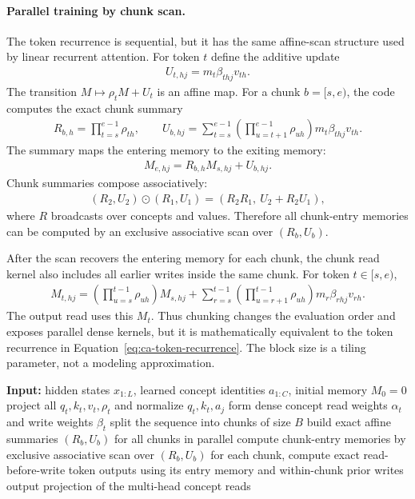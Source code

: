 \paragraph{Parallel training by chunk scan.}
The token recurrence is sequential, but it has the same affine-scan structure used by linear recurrent attention. For token $t$ define the additive update
\begin{align*}
U_{t,hj}=m_t\beta_{thj}v_{th}.
\end{align*}
The transition $M\mapsto \rho_t M+U_t$ is an affine map. For a chunk $b=[s,e)$, the code computes the exact chunk summary
\begin{align*}
R_{b,h}=\prod_{t=s}^{e-1}\rho_{th},
\qquad
U_{b,hj}=\sum_{t=s}^{e-1}
\left(\prod_{u=t+1}^{e-1}\rho_{uh}\right)
m_t\beta_{thj}v_{th}.
\end{align*}
The summary maps the entering memory to the exiting memory:
\begin{align*}
M_{e,hj}=R_{b,h}M_{s,hj}+U_{b,hj}.
\end{align*}
Chunk summaries compose associatively:
\begin{align*}
(R_2,U_2)\odot(R_1,U_1)
=
(R_2R_1,\ U_2+R_2U_1),
\end{align*}
where $R$ broadcasts over concepts and values. Therefore all chunk-entry memories can be computed by an exclusive associative scan over $(R_b,U_b)$.

After the scan recovers the entering memory for each chunk, the chunk read kernel also includes all earlier writes inside the same chunk. For token $t\in[s,e)$,
\begin{align*}
M_{t,hj}
=
\left(\prod_{u=s}^{t-1}\rho_{uh}\right)M_{s,hj}
+
\sum_{r=s}^{t-1}
\left(\prod_{u=r+1}^{t-1}\rho_{uh}\right)
m_r\beta_{rhj}v_{rh}.
\end{align*}
The output read uses this $M_t$. Thus chunking changes the evaluation order and exposes parallel dense kernels, but it is mathematically equivalent to the token recurrence in Equation~\eqref{eq:ca-token-recurrence}. The block size is a tiling parameter, not a modeling approximation.

\begin{algorithm}[H]
\caption{\textsc{CAForward} as implemented}
\label{alg:ca-forward}
\begin{algorithmic}[1]
\State \textbf{Input:} hidden states $x_{1:L}$, learned concept identities $a_{1:C}$, initial memory $M_0=0$
\State project all $q_t,k_t,v_t,\rho_t$ and normalize $q_t,k_t,a_j$
\State form dense concept read weights $\alpha_t$ and write weights $\beta_t$
\State split the sequence into chunks of size $B$
\State build exact affine summaries $(R_b,U_b)$ for all chunks in parallel
\State compute chunk-entry memories by exclusive associative scan over $(R_b,U_b)$
\State for each chunk, compute exact read-before-write token outputs using its entry memory and within-chunk prior writes
\State \Return output projection of the multi-head concept reads
\end{algorithmic}
\end{algorithm}

